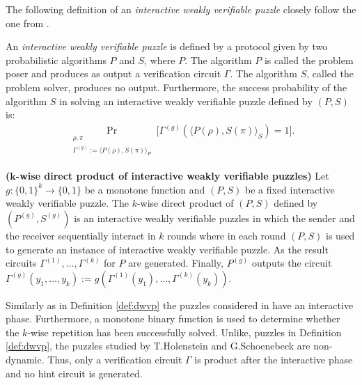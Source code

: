 The following definition of an \textit{interactive weakly verifiable puzzle} closely follow the one from \cite{DBLP:journals/corr/abs-1002-3534}.
\begin{definition}
An \textit{interactive weakly verifiable puzzle} is defined by a protocol given by two probabilistic algorithms $P$ and $S$,
where $P$. The algorithm $P$ is called the problem poser and produces as output a verification circuit $\Gamma$.
The algorithm $S$, called the problem solver, produces no output.
Furthermore, the \textnormal{success probability} of the algorithm $S$ in solving an interactive weakly verifiable puzzle defined by $(P,S)$ is:
\begin{align*}
  \underset{\substack{\rho, \pi \\ \Gamma^{(g)} := \langle P(\rho), S(\pi) \rangle_{P}}}{\Pr}\Big[\Gamma^{(g)}(\langle P(\rho),S(\pi) \rangle_{S}) = 1 \Big].
\end{align*}
\end{definition}
\begin{definition}\textbf{($\boldsymbol{k}$-wise direct product of interactive weakly verifiable puzzles)}
Let $g: \{0,1\}^{k} \rightarrow \{0,1\}$ be a monotone function and $(P,S)$ be a fixed interactive weakly verifiable puzzle.
The $k$-wise direct product of $(P,S)$ defined by $(P^{(g)}, S^{(g)})$ is an interactive weakly verifiable puzzles in which the sender and the receiver
sequentially interact in $k$ rounds where in each round $(P,S)$ is used to generate an instance of interactive weakly verifiable puzzle.
As the result circuits $\Gamma^{(1)}, \dotsc, \Gamma^{(k)}$ for $P$ are generated.
Finally, $P^{(g)}$ outputs the circuit $\Gamma^{(g)}(y_1, \dotsc, y_k) := g(\Gamma^{(1)}(y_1), \dotsc, \Gamma^{(k)}(y_k))$.
\end{definition}

Similarly as in Definition \ref{def:dwvp} the puzzles considered in \cite{DBLP:journals/corr/abs-1002-3534} have
an interactive phase. Furthermore, a monotone binary function is used to determine whether the $k$-wise repetition
has been successfully solved. Unlike, puzzles in Definition \ref{def:dwvp}, the puzzles studied by T.Holenstein and G.Schoenebeck
are non-dynamic. Thus, only a verification circuit $\Gamma$ is product after the interactive phase and no hint circuit is generated.

